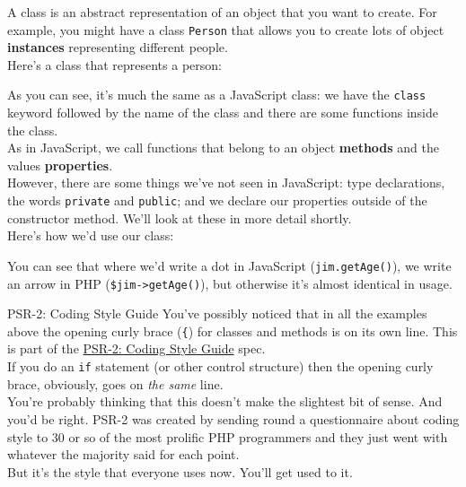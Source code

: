 A class is an abstract representation of an object that you want to create. For example, you might have a class \texttt{Person} that allows you to create lots of object \textbf{instances} representing different people.
\\

Here's a class that represents a person:


As you can see, it's much the same as a JavaScript class: we have the \texttt{class} keyword followed by the name of the class and there are some functions inside the class.
\\

As in JavaScript, we call functions that belong to an object \textbf{methods} and the values \textbf{properties}.
\\

However, there are some things we've not seen in JavaScript: type declarations, the words \texttt{private} and \texttt{public}; and we declare our properties outside of the constructor method. We'll look at these in more detail shortly.
\\

Here's how we'd use our class:


You can see that where we'd write a dot in JavaScript (\texttt{jim.getAge()}), we write an arrow in PHP (\texttt{\$jim->getAge()}), but otherwise it's almost identical in usage.

\pagebreak

\begin{infobox}{PSR-2: Coding Style Guide}
    You've possibly noticed that in all the examples above the opening curly brace (\texttt{\{}) for classes and methods is on its own line. This is part of the \href{https://www.php-fig.org/psr/psr-2/}{PSR-2: Coding Style Guide} spec.
    \\

    If you do an \texttt{if} statement (or other control structure) then the opening curly brace, obviously, goes on \textit{the same} line.
    \\

    You're probably thinking that this doesn't make the slightest bit of sense. And you'd be right. PSR-2 was created by sending round a questionnaire about coding style to 30 or so of the most prolific PHP programmers and they just went with whatever the majority said for each point.
    \\

    But it's the style that everyone uses now. You'll get used to it.
\end{infobox}


